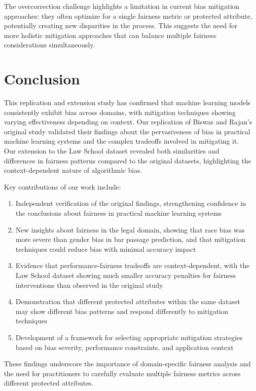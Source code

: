 \documentclass[10pt,journal,compsoc]{IEEEtran}
\begin{document}
The overcorrection challenge highlights a limitation in current bias mitigation approaches: they often optimize for a single fairness metric or protected attribute, potentially creating new disparities in the process. This suggests the need for more holistic mitigation approaches that can balance multiple fairness considerations simultaneously.

\section{Conclusion}
This replication and extension study has confirmed that machine learning models consistently exhibit bias across domains, with mitigation techniques showing varying effectiveness depending on context. Our replication of Biswas and Rajan's original study validated their findings about the pervasiveness of bias in practical machine learning systems and the complex tradeoffs involved in mitigating it. Our extension to the Law School dataset revealed both similarities and differences in fairness patterns compared to the original datasets, highlighting the context-dependent nature of algorithmic bias.

Key contributions of our work include:
\begin{enumerate}
\item Independent verification of the original findings, strengthening confidence in the conclusions about fairness in practical machine learning systems
\item New insights about fairness in the legal domain, showing that race bias was more severe than gender bias in bar passage prediction, and that mitigation techniques could reduce bias with minimal accuracy impact
\item Evidence that performance-fairness tradeoffs are context-dependent, with the Law School dataset showing much smaller accuracy penalties for fairness interventions than observed in the original study
\item Demonstration that different protected attributes within the same dataset may show different bias patterns and respond differently to mitigation techniques
\item Development of a framework for selecting appropriate mitigation strategies based on bias severity, performance constraints, and application context
\end{enumerate}

These findings underscore the importance of domain-specific fairness analysis and the need for practitioners to carefully evaluate multiple fairness metrics across different protected attributes.
\end{document}
